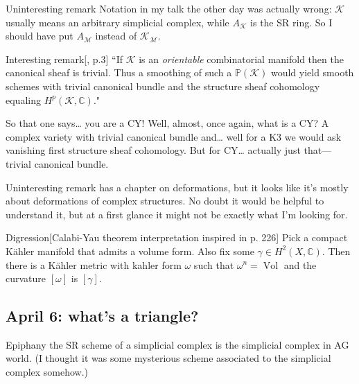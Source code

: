 \begin{thing5}{Uninteresting remark}\leavevmode
	Notation in my talk the other day was actually wrong: \(\mathcal{K}\) usually means an arbitrary simplicial complex, while \(A_{\mathcal{K}}\) is the SR ring. So I should have put \(A_{\mathcal{M}}\) instead of \(\mathcal{K}_\mathcal{M}\).
\end{thing5}

\begin{thing8}{Interesting remark}[\cite{jan1}, p.3]\leavevmode
``If \(\mathcal{K}\) is an \textit{orientable}  combinatorial manifold then the canonical sheaf is trivial. Thus a smoothing of such a \(\mathbb{P}(\mathcal{K})\) would yield smooth schemes with trivial canonical bundle and the structure sheaf cohomology equaling \(H^{p}(\mathcal{K},\mathbb{C})\)."
\end{thing8}

So that one says… you are a CY! Well, almost, once again, what is a CY? A complex variety with trivial canonical bundle and… well for a K3 we would ask vanishing first structure sheaf cohomology. But for CY… actually just that---trivial canonical bundle.

\begin{thing4}{Uninteresting remark}\leavevmode
\cite{huc} has a chapter on deformations, but it looks like it's mostly about deformations of complex structures. No doubt it would be helpful to understand it, but at a first glance it might not be exactly what I'm looking for.
\end{thing4}

\begin{thing6}{Digression}[Calabi-Yau theorem interpretation inspired in \cite{huc} p. 226]\leavevmode
	Pick a compact Kähler manifold that admits a volume form. Also fix some \(\gamma \in H^{2}(X,\mathbb{C})\).  Then there is a Kähler metric with kahler form \(\omega\) such that \(\omega^n=\operatorname{Vol}\) and the curvature \([\omega]\) is \([\gamma]\).
\end{thing6}

\subsection{April 6: what's a triangle?}

\begin{thing8}{Epiphany}\leavevmode
the SR scheme of a simplicial complex is the simplicial complex in AG world. (I thought it was some mysterious scheme associated to the simplicial complex somehow.) 
\end{thing8}

